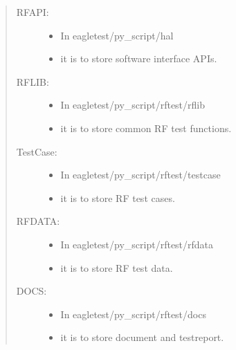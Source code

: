 \documentclass[letterpaper,10pt,english]{sphinxhowto}
\begin{document}
\label{\detokenize{quick_start/quick_start:project-introduction}}\begin{quote}
\begin{description}
\item[{RFAPI:}] \leavevmode\begin{itemize}
\item {} 
In eagletest/py\_script/hal

\item {} 
it is to store software interface APIs.

\end{itemize}

\item[{RFLIB:}] \leavevmode\begin{itemize}
\item {} 
In eagletest/py\_script/rftest/rflib

\item {} 
it is to store common RF test functions.

\end{itemize}

\item[{TestCase:}] \leavevmode\begin{itemize}
\item {} 
In eagletest/py\_script/rftest/testcase

\item {} 
it is to store RF test cases.

\end{itemize}

\item[{RFDATA:}] \leavevmode\begin{itemize}
\item {} 
In eagletest/py\_script/rftest/rfdata

\item {} 
it is to store RF test data.

\end{itemize}

\item[{DOCS:}] \leavevmode\begin{itemize}
\item {} 
In eagletest/py\_script/rftest/docs

\item {} 
it is to store document and testreport.

\end{itemize}

\end{description}
\end{quote}
\end{document}
